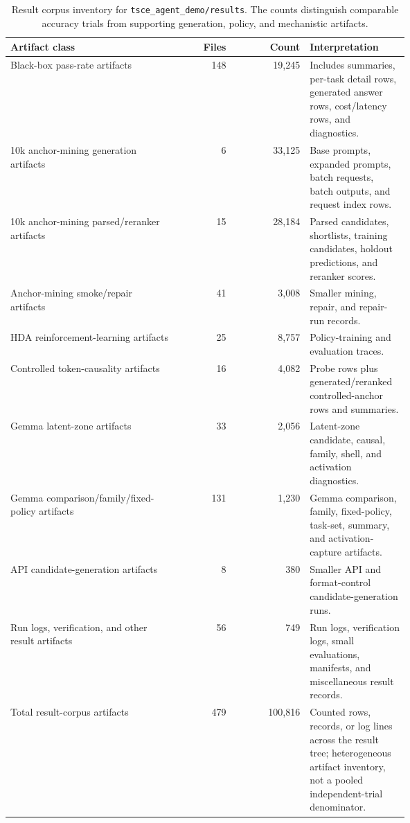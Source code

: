 \documentclass[11pt]{article}
\newcommand{\hda}{\textsc{HDA}}
\begin{document}
\begin{table}[H]
\centering
\small
\begin{tabular}{L{0.42\linewidth}rrL{0.25\linewidth}}
\toprule
Artifact class & Files & Count & Interpretation \\
\midrule
Black-box pass-rate artifacts & 148 & 19,245 & Includes summaries, per-task detail rows, generated answer rows, cost/latency rows, and diagnostics. \\
10k anchor-mining generation artifacts & 6 & 33,125 & Base prompts, expanded prompts, batch requests, batch outputs, and request index rows. \\
10k anchor-mining parsed/reranker artifacts & 15 & 28,184 & Parsed candidates, shortlists, training candidates, holdout predictions, and reranker scores. \\
Anchor-mining smoke/repair artifacts & 41 & 3,008 & Smaller mining, repair, and repair-run records. \\
\hda{} reinforcement-learning artifacts & 25 & 8,757 & Policy-training and evaluation traces. \\
Controlled token-causality artifacts & 16 & 4,082 & Probe rows plus generated/reranked controlled-anchor rows and summaries. \\
Gemma latent-zone artifacts & 33 & 2,056 & Latent-zone candidate, causal, family, shell, and activation diagnostics. \\
Gemma comparison/family/fixed-policy artifacts & 131 & 1,230 & Gemma comparison, family, fixed-policy, task-set, summary, and activation-capture artifacts. \\
API candidate-generation artifacts & 8 & 380 & Smaller API and format-control candidate-generation runs. \\
Run logs, verification, and other result artifacts & 56 & 749 & Run logs, verification logs, small evaluations, manifests, and miscellaneous result records. \\
\midrule
Total result-corpus artifacts & 479 & 100,816 & Counted rows, records, or log lines across the result tree; heterogeneous artifact inventory, not a pooled independent-trial denominator. \\
\bottomrule
\end{tabular}
\caption{Result corpus inventory for \texttt{tsce\_agent\_demo/results}. The counts distinguish comparable accuracy trials from supporting generation, policy, and mechanistic artifacts.}
\label{tab:result-corpus}
\end{table}
\end{document}

